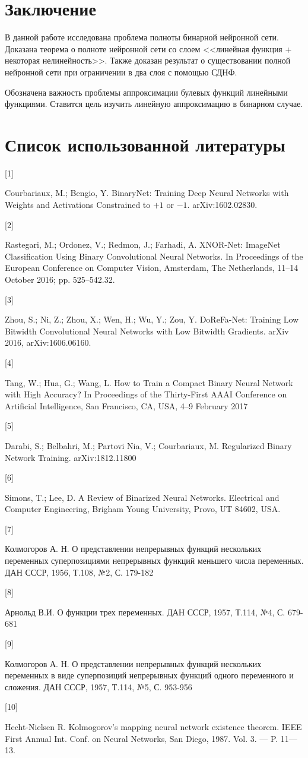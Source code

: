 \documentclass[a4paper, 14pt]{extarticle}
\begin{document}
\newpage

        
\section{Заключение}
    В данной работе исследована проблема полноты бинарной нейронной сети. Доказана теорема о полноте нейронной сети со слоем <<линейная функция + некоторая нелинейность>>. Также доказан результат о существовании полной нейронной сети при ограничении в два слоя с помощью СДНФ.
    
    Обозначена важность проблемы аппроксимации булевых функций линейными функциями. Ставится цель изучить линейную аппроксимацию в бинарном случае.
\newpage


\section{Список использованной литературы}
    \hypertarget{p1}{[1]} Courbariaux, M.; Bengio, Y. BinaryNet: Training Deep Neural Networks with Weights and Activations Constrained to $+1$ or $-1$. arXiv:1602.02830.
    
    \hypertarget{p2}{[2]} Rastegari, M.; Ordonez, V.; Redmon, J.; Farhadi, A. XNOR-Net: ImageNet Classification Using Binary Convolutional Neural Networks. In Proceedings of the European Conference on Computer Vision, Amsterdam, The Netherlands, 11–14 October 2016; pp. 525–542.32.
    
    \hypertarget{p3}{[3]} Zhou, S.; Ni, Z.; Zhou, X.; Wen, H.; Wu, Y.; Zou, Y. DoReFa-Net: Training Low Bitwidth Convolutional Neural Networks with Low Bitwidth Gradients. arXiv 2016, arXiv:1606.06160.
    
    \hypertarget{p4}{[4]} Tang, W.; Hua, G.; Wang, L. How to Train a Compact Binary Neural Network with High Accuracy? In Proceedings of the Thirty-First AAAI Conference on Artificial Intelligence, San Francisco, CA, USA, 4–9 February 2017
    
    \hypertarget{p5}{[5]} Darabi, S.; Belbahri, M.; Partovi Nia, V.; Courbariaux, M. Regularized Binary Network Training. arXiv:1812.11800
    
    \hypertarget{p6}{[6]} Simons, T.; Lee, D. A Review of Binarized Neural Networks. Electrical and Computer Engineering, Brigham Young University, Provo, UT 84602, USA.
    
    \hypertarget{p7}{[7]} Колмогоров А. Н. О представлении непрерывных функций нескольких переменных суперпозициями непрерывных функций меньшего числа переменных. ДАН СССР, 1956, Т.108, №2, С. 179-182
    
    \hypertarget{p7}{[8]} Арнольд В.И. О функции трех переменных. ДАН СССР, 1957, Т.114, №4, С. 679-681
    
    \hypertarget{p7}{[9]} Колмогоров А. Н. О представлении непрерывных функций нескольких переменных в виде суперпозиций непрерывных функций одного переменного и сложения. ДАН СССР, 1957, Т.114, №5, С. 953-956
    
    \hypertarget{p7}{[10]} Hecht-Nielsen R. Kolmogorov’s mapping neural network existence theorem. IEEE First Annual Int. Conf. on Neural Networks, San Diego, 1987. Vol. 3. — P. 11—13.
 
    
\end{document}
